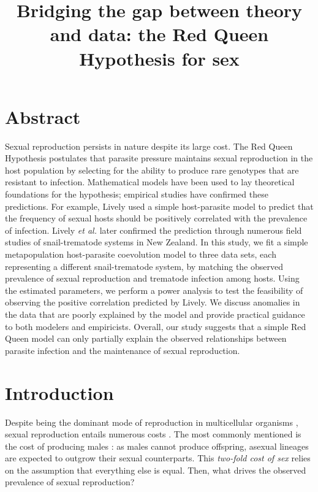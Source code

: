 \documentclass{article}\usepackage[]{graphicx}\usepackage[]{color}
\title{Bridging the gap between theory and data: the Red Queen Hypothesis for sex}
\author{}
\date{}
\begin{document}
\maketitle

\section*{Abstract}

Sexual reproduction persists in nature despite its large cost.
The Red Queen Hypothesis postulates that parasite pressure maintains sexual reproduction in the host population by selecting for the ability to produce rare genotypes that are resistant to infection.
Mathematical models have been used to lay theoretical foundations for the hypothesis; empirical studies have confirmed these predictions.
For example, Lively used a simple host-parasite model to predict that the frequency of sexual hosts should be positively correlated with the prevalence of infection. 
Lively \textit{et al.} later confirmed the prediction through numerous field studies of snail-trematode systems in New Zealand.
In this study, we fit a simple metapopulation host-parasite coevolution model to three data sets, each representing a different snail-trematode system, by matching the observed prevalence of sexual reproduction and trematode infection among hosts.
Using the estimated parameters, we perform a power analysis to test the feasibility of observing the positive correlation predicted by Lively.
We discuss anomalies in the data that are poorly explained by the model and provide practical guidance to both modelers and empiricists.
Overall, our study suggests that a simple Red Queen model can only partially explain the observed relationships between parasite infection and the maintenance of sexual reproduction.



\section{Introduction}

Despite being the dominant mode of reproduction in multicellular organisms \citep{vrijenhoek1998animal, whitton2008dynamic, otto2009evolutionary}, sexual reproduction entails numerous costs \citep{lehtonen2012many}.
The most commonly mentioned is the cost of producing males \citep{smith1978evolution}:
as males cannot produce offspring, asexual lineages are expected to outgrow their sexual counterparts.
This \emph{two-fold cost of sex} \citep{smith1978evolution} relies on the assumption that everything else is equal.
Then, what drives the observed prevalence of sexual reproduction?
\end{document}
